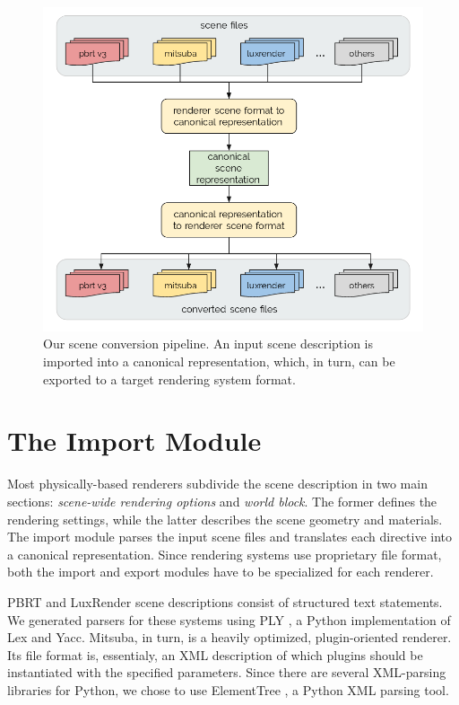 \begin{figure}[h]
  \includegraphics[width=\textwidth,height=\textheight,keepaspectratio]{images/4_system_architecture/architecture.png}
  \caption{Our scene conversion pipeline. An input scene description is imported into a canonical representation, which, in turn, can be exported to a target rendering system format.}
  \label{fig:sysarch}
\end{figure}

\section{The Import Module}
Most physically-based renderers subdivide the scene description in two main sections:
{\it scene-wide rendering options} and {\it world block}. The former defines the rendering settings, while the latter describes the scene geometry and materials.
%
The import module parses the input scene files and translates each directive into a canonical
representation. Since rendering systems use proprietary file format, both the import and export modules have to be specialized for each renderer.

PBRT and LuxRender scene descriptions consist of structured text statements. We generated parsers for these systems using 
PLY \cite{ply}, a Python implementation of Lex and Yacc.
%
Mitsuba, in turn, is a heavily optimized, plugin-oriented renderer. Its file
format is, essentialy, an XML description of which plugins should be instantiated
with the specified parameters. Since there are several XML-parsing libraries for Python,
we chose to use ElementTree \cite{ET}, a Python XML parsing tool.


